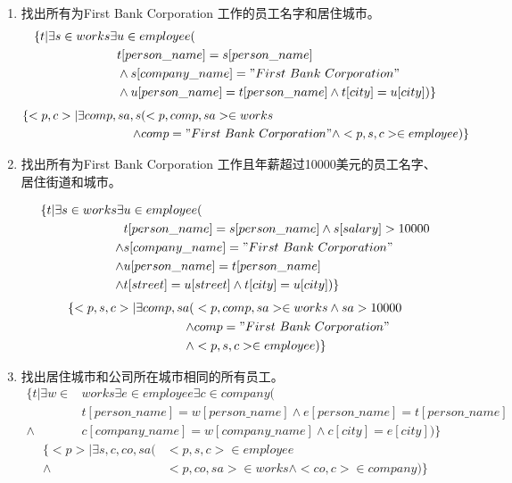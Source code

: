 \documentclass{dingjia}
\begin{document}
\begin{enumerate}
\begin{enumerate}
  \item 找出所有为First Bank Corporation 工作的员工名字和居住城市。
    \begin{align*}
      \{ t | \exists s \in works \exists  & u \in employee( \\
                                          & t[person\_name] = s[person\_name] \\
                                          & \land s[company\_name] = "First\ Bank\ Corporation" \\
                                          & \land u[person\_name] = t[person\_name] \land t[city] = u[city]) \}
    \end{align*}
    \begin{align*}
      \{<p,c> | \exists comp,sa,s & (<p,comp,sa> \in works \\
      \land & comp = "First\ Bank\ Corporation" \land <p,s,c> \in employee)\}
    \end{align*}

  \item 找出所有为First Bank Corporation 工作且年薪超过10000美元的员工名字、
    居住街道和城市。

    \begin{align*}
      \{ t | \exists s \in works \exists  & u \in employee( \\
                                          & t[person\_name] = s[person\_name] \land s[salary] > 10000 \\
      \land & s[company\_name] = "First\ Bank\ Corporation" \\
      \land & u[person\_name] = t[person\_name] \\
      \land & t[street] = u[street] \land t[city] = u[city]) \}
    \end{align*}
    \begin{align*}
      \{<p,s,c> | \exists comp,sa  (& <p,comp,sa> \in works \land sa > 10000 \\
      \land& comp = "First\ Bank\ Corporation" \\
      \land &<p,s,c> \in employee)\}
    \end{align*}

  \item 找出居住城市和公司所在城市相同的所有员工。
    \begin{align*}
      \{ t | \exists w \in & works \exists e \in employee \exists c \in company( \\
                           & t[person\_name] = w[person\_name] \land e[person\_name] = t[person\_name] \\
      \land & c[company\_name] = w[company\_name] \land c[city] = e[city]) \}
    \end{align*}
    \begin{align*}
      \{<p>| \exists s,c,co,sa( & <p,s,c> \in employee \\
      \land & <p, co, sa> \in works \land <co, c> \in company)\}
    \end{align*}


\end{enumerate}
\end{enumerate}
\end{document}

